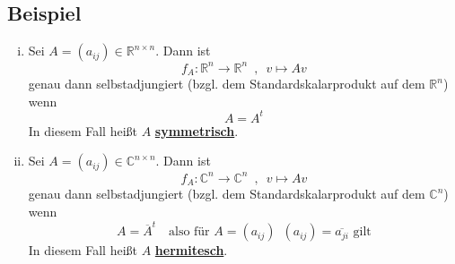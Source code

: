 \subsection{Beispiel} %
\label{sub:beispiel_15.3}
\begin{enumerate}[(i)]
	\item Sei $A= (a_{ij}) \in \mathds{R}^{n \times n}$. Dann ist 
	\[
		f_A : \mathds{R}^n \to \mathds{R}^n \enspace , \enspace v \mapsto Av
	\]
	genau dann selbstadjungiert (bzgl. dem Standardskalarprodukt auf dem $\mathds{R}^n$) wenn 
	\[
		A = A^t
	\]
	In diesem Fall heißt $A$ \underline{\textbf{symmetrisch}}.
	\item Sei $A= (a_{ij}) \in \mathds{C}^{n \times n}$. Dann ist 
	\[
		f_A : \mathds{C}^n \to \mathds{C}^n \enspace , \enspace v \mapsto Av
	\]
	genau dann selbstadjungiert (bzgl. dem Standardskalarprodukt auf dem $\mathds{C}^n$) wenn 
	\[
		A = \overline{A}^t \quad \text{also für } A = (a_{ij}) \enspace (a_{ij}) =  \overline{a_{ji}} \text{ gilt}
	\]
	In diesem Fall heißt $A$ \underline{\textbf{hermitesch}}.
\end{enumerate}

